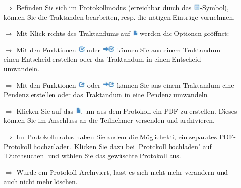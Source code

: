 \documentclass{article}
\begin{document}
\begin{multicols}{2}

\begin{tcolorbox}[colback=blue!5,colframe=blue!40!black,title=Das Protokoll führen]
\begin{itemize}
  \item[$\Longrightarrow$] Befinden Sie sich im Protokollmodus (erreichbar durch das \includegraphics[height=10pt]{Icons/Listensymbol.jpg}-Symbol), können Sie die Traktanden bearbeiten, resp. die nötigen Einträge vornehmen.
	\item[$\Longrightarrow$] Mit Klick rechts des Traktandums auf \includegraphics[height=10pt]{Icons/Blattsymbol.jpg} werden die Optionen geöffnet:
  \item[$\Longrightarrow$] Mit den Funktionen \includegraphics[height=10pt]{Icons/Gutzeichen_Rahmen.jpg} oder \includegraphics[height=10pt]{Icons/Pfeil_Gutzeichen.jpg} können Sie aus einem Traktandum einen Entscheid erstellen oder das Traktandum in einen Entscheid umwandeln.
	  \item[$\Longrightarrow$] Mit den Funktionen \includegraphics[height=10pt]{Icons/Pfeil_aus_Box.jpg} oder \includegraphics[height=10pt]{Icons/Pfeil_Pfeil_aus_Box.jpg} können Sie aus einem Traktandum eine Pendenz erstellen oder das Traktandum in eine Pendenz umwandeln.
  \item[$\Longrightarrow$] Klicken Sie auf das \includegraphics[height=10pt]{Icons/Blattsymbol.jpg}, um aus dem Protokoll ein PDF zu erstellen. Dieses können Sie im Anschluss an die Teilnehmer versenden und archivieren.
	\item[$\Longrightarrow$] Im Protokollmodus haben Sie zudem die Möglichekti, ein separates PDF-Protokoll hochzuladen. Klicken Sie dazu bei 'Protokoll hochladen' auf 'Durchsuchen' und wählen Sie das gewüschte Protokoll aus.
	\item[$\Longrightarrow$] Wurde ein Protokoll Archiviert, lässt es sich nicht mehr verändern und auch nicht mehr löschen.
\end{itemize}
\end{tcolorbox}



\end{multicols}
\end{document}
